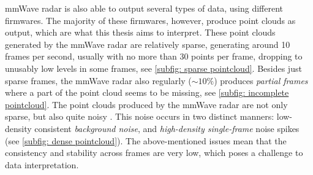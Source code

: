 mmWave radar is also able to output several types of data, using different firmwares.
The majority of these firmwares, however, produce point clouds as output, which are what this thesis aims to interpret.
These point clouds generated by the mmWave radar are relatively sparse, generating around 10 frames per second, usually with no more than 30 points per frame, dropping to unusably low levels in some frames, see \cref{subfig: sparse pointcloud}.
Besides just sparse frames, the mmWave radar also regularly ($\sim10\%$) produces \textit{partial frames} where a part of the point cloud seems to be missing, see \cref{subfig: incomplete pointcloud}.
The point clouds produced by the mmWave radar are not only sparse, but also quite noisy \cite{brescia2023millinoise}.
This noise occurs in two distinct manners: low-density consistent \textit{background noise}, and \textit{high-density single-frame} noise spikes (see \cref{subfig: dense pointcloud}).
The above-mentioned issues mean that the consistency and stability across frames are very low, which poses a challenge to data interpretation.

